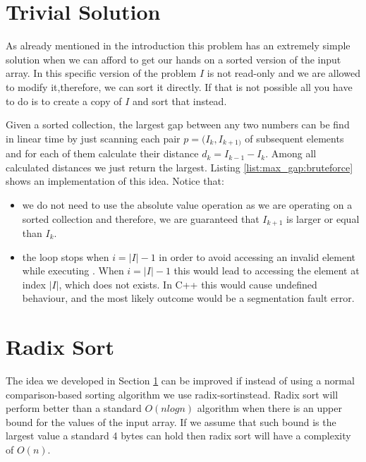 

\section{Trivial Solution}
\label{max_gap:sec:trivial}
As already mentioned in the introduction this problem has an extremely simple solution when we can
afford to get our hands on a sorted version of the input array. In this specific version of the
problem $I$ is not read-only and we are allowed to modify it,therefore, we can sort it directly. If
that is not possible all you have to do is to create a copy of $I$ and sort that instead. 

Given a sorted collection, the largest gap between any two numbers can be find in linear time by
just scanning each pair $p=(I_k, I_{k+1)}$ of subsequent elements and for each of them calculate
their distance $d_k=I_{k-1}-I_k$. Among all calculated distances we just return the largest. Listing
\ref{list:max_gap:bruteforce} shows an implementation of this idea. Notice that:
\begin{itemize}
	\item we do not need to use the absolute value operation as we are operating on a sorted
	collection and therefore, we are guaranteed that $I_{k+1}$ is larger or equal than $I_k$.
	\item the  loop stops when $i=|I|-1$ in order to avoid accessing an invalid element
	while executing . When $i=|I|-1$ this would lead to accessing the element at
	index $|I|$, which does not exists. In C++ this would cause undefined behaviour, and the most
	likely outcome would be a segmentation fault error.
\end{itemize}




\section{Radix Sort}
\label{max_gap:sec:radix_sort}
The idea we developed in Section \ref{max_gap:sec:trivial} can be improved if instead of using a
normal comparison-based sorting algorithm  we use radix-sort\cite{cit::wiki::radix_sort }instead.
Radix sort will perform better than a standard $O(nlogn)$ algorithm when there is an upper bound for
the values of the input array. If we assume that such bound is the largest value a standard 4 bytes
 can hold then radix sort will have a complexity of $O(n)$.

